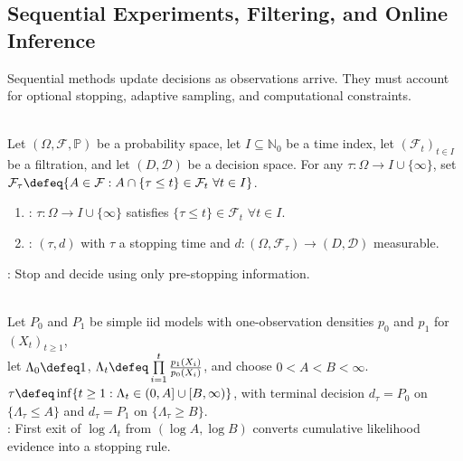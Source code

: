 \subsection{Sequential Experiments, Filtering, and Online Inference}

Sequential methods update decisions as observations arrive.  They must account for optional stopping, adaptive sampling, and computational constraints.

\begin{definition} \label{def:sequential-test-stopping-time} \\
Let $(\Omega,\mathcal{F},\mathbb{P})$ be a probability space, let $I\subseteq\mathbb{N}_0$ be a time index, let $(\mathcal{F}_t)_{t\in I}$ be a filtration, and let $(D,\mathcal{D})$ be a decision space.
For any $\tau:\Omega\to I\cup\{\infty\}$, set $\mathcal{F}_\tau\defeq\{A\in\mathcal{F}:A\cap\{\tau\leq t\}\in\mathcal{F}_t\ \forall t\in I\}$.
\begin{enumerate}[label=(\roman*)]
\setlength{\itemsep}{0pt}
\item {}: $\tau:\Omega\to I\cup\{\infty\}$ satisfies $\{\tau\leq t\}\in\mathcal{F}_t$ $\forall t\in I$.
\item {}: $(\tau,d)$ with $\tau$ a stopping time and $d:(\Omega,\mathcal{F}_\tau)\to(D,\mathcal{D})$ measurable.
\end{enumerate}
: Stop and decide using only pre-stopping information.
\end{definition}

\begin{definition} \label{def:sprt} \\
Let $P_0$ and $P_1$ be simple iid models with one-observation densities $p_0$ and $p_1$ for $(X_t)_{t\geq1}$,\\
let $\Lambda_0\defeq1$, $\Lambda_t\defeq\prod\limits_{i=1}^{t}\frac{p_1(X_i)}{p_0(X_i)}$, and choose $0<A<B<\infty$.\\
$\tau\defeq\inf\{t\geq1:\Lambda_t\in(0,A]\cup[B,\infty)\}$, with terminal decision $d_\tau=P_0$ on $\{\Lambda_\tau\leq A\}$ and $d_\tau=P_1$ on $\{\Lambda_\tau\geq B\}$.\\
: First exit of $\log\Lambda_t$ from $(\log A,\log B)$ converts cumulative likelihood evidence into a stopping rule.
\end{definition}

